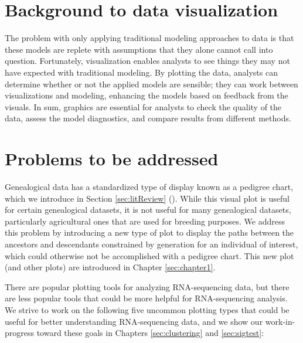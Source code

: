 \documentclass[11pt,a4paper,oldfontcommands,openany]{memoir}
\numberwithin{equation}{section} %
\begin{document}
\section{Background to data visualization}

The problem with only applying traditional modeling approaches to data is that these models are replete with assumptions that they alone cannot call into question. Fortunately, visualization enables analysts to see things they may not have expected with traditional modeling. By plotting the data, analysts can determine whether or not the applied models are sensible; they can work between visualizations and modeling, enhancing the models based on feedback from the visuals. In sum, graphics are essential for analysts to check the quality of the data, assess the model diagnostics, and compare results from different methods.

\section{Problems to be addressed}

Genealogical data has a standardized type of display known as a pedigree chart, which we introduce in Section \ref{sec:litReview} (\citealt{ped}). While this visual plot is useful for certain genealogical datasets, it is not useful for many genealogical datasets, particularly agricultural ones that are used for breeding purposes. We address this problem by introducing a new type of plot to display the paths between the ancestors and descendants constrained by generation for an individual of interest, which could otherwise not be accomplished with a pedigree chart. This new plot (and other plots) are introduced in Chapter \ref{sec:chapter1}.

There are popular plotting tools for analyzing RNA-sequencing data, but there are less popular tools that could be more helpful for RNA-sequencing analysis. We strive to work on the following five uncommon plotting types that could be useful for better understanding RNA-sequencing data, and we show our work-in-progress toward these goals in Chapters \ref{sec:clustering} and \ref{sec:sigtest}:

\clearpage
\end{document}
